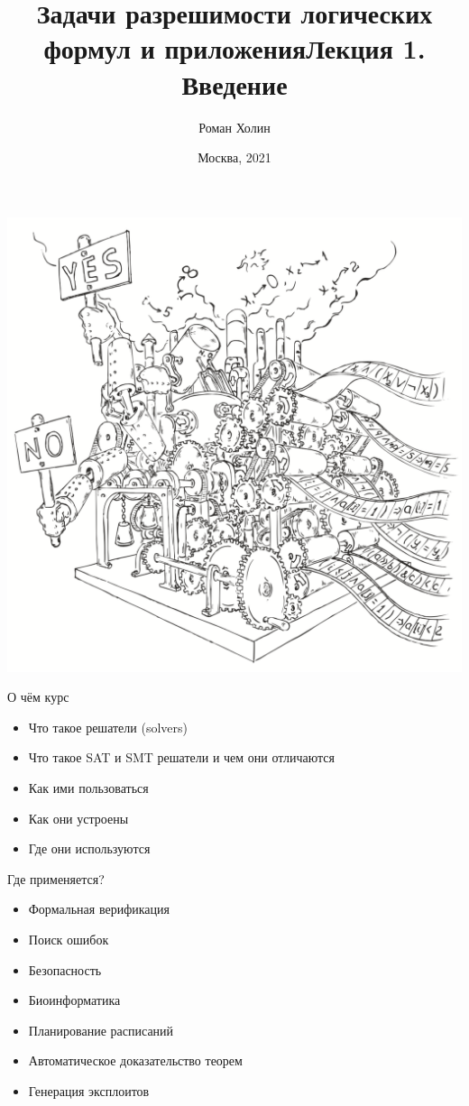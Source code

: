 \documentclass{beamer}
\begin{document}
\title{Задачи разрешимости логических формул и приложения\newline Лекция 1. Введение}
\author{Роман Холин}
\date{Москва, 2021}

\begin{frame}
\includegraphics[scale=0.5]{../decision-procedure.png}
\end{frame}

\frame{\titlepage}

\begin{frame}{О чём курс}
\begin{itemize}
\item Что такое решатели (solvers)
\item Что такое SAT и SMT решатели и чем они отличаются
\item Как ими пользоваться
\item Как они устроены
\item Где они используются
\end{itemize}
\end{frame}

\begin{frame}{Где применяется?}
\begin{itemize}
\item Формальная верификация
\item Поиск ошибок
\item Безопасность
\item Биоинформатика
\item Планирование расписаний
\item Автоматическое доказательство теорем
\item Генерация эксплоитов
\end{itemize}
\end{frame}
\end{document}
